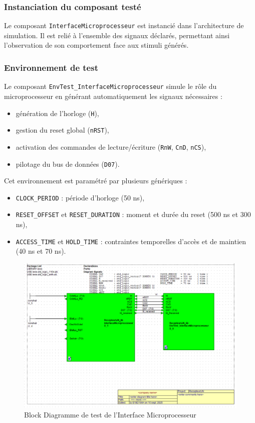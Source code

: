 \subsubsection{Instanciation du composant testé}
Le composant \texttt{InterfaceMicroprocesseur} est instancié dans l’architecture de simulation.  
Il est relié à l’ensemble des signaux déclarés, permettant ainsi l’observation de son comportement face aux stimuli générés.

\subsubsection{Environnement de test}
Le composant \texttt{EnvTest\_InterfaceMicroprocesseur} simule le rôle du microprocesseur en générant automatiquement les signaux nécessaires :
\begin{itemize}
  \item génération de l’horloge (\texttt{H}),
  \item gestion du reset global (\texttt{nRST}),
  \item activation des commandes de lecture/écriture (\texttt{RnW}, \texttt{CnD}, \texttt{nCS}),
  \item pilotage du bus de données (\texttt{D07}).
\end{itemize}

Cet environnement est paramétré par plusieurs génériques :
\begin{itemize}
  \item \texttt{CLOCK\_PERIOD} : période d’horloge (50 ns),
  \item \texttt{RESET\_OFFSET} et \texttt{RESET\_DURATION} : moment et durée du reset (500 ns et 300 ns),
  \item \texttt{ACCESS\_TIME} et \texttt{HOLD\_TIME} : contraintes temporelles d’accès et de maintien (40 ns et 70 ns).
\end{itemize}

\begin{figure}[H]
    \centering
    \includegraphics[width=0.95\linewidth]{images/Simulation/banc_test.png}
    \caption{Block Diagramme de test de l’Interface Microprocesseur}
    \label{fig:placeholder}
\end{figure}

